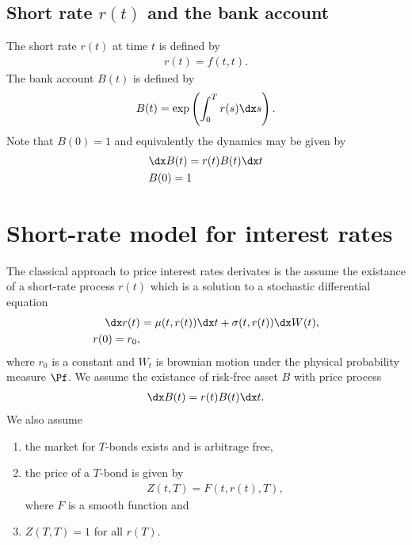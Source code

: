 \subsection{Short rate $r(t)$ and the bank account}  

The short rate $r(t)$ at time $t$ is defined by
  \begin{align}
    r(t) = f(t,t).
  \end{align}
The bank account $B(t)$ is defined by
  \begin{align}
    B(t) = \exp \left( \int_0^T r(s) \dx s \right) .
  \end{align}
Note that $B(0) = 1$ and equivalently the dynamics may be given by
  \begin{align}
    &\dx B(t) = r(t) B(t) \dx t \\
    &B(0) = 1
  \end{align}
  
\section{Short-rate model for interest rates}

The classical approach to price interest rates derivates is the assume the existance of a short-rate process $r(t)$ which is a solution to a stochastic differential equation
  \begin{align}
    \dx r(t) &= \mu(t, r(t)) \dx t + \sigma(t, r(t)) \dx W(t), \\
    r(0) = r_0,
  \end{align}
where $r_0$ is a constant and $W_t$ is brownian motion under the physical probability measure $\Pf$. We assume the existance of risk-free asset $B$ with price process
  \begin{align}
    \dx B(t) = r(t) B(t) \dx t .
  \end{align}
We also assume 
  \begin{enumerate}[labelindent=\parindent, leftmargin=*]
    \item the market for $T$-bonds exists and is arbitrage free,
    \item the price of a $T$-bond is given by
      \begin{align}
        Z(t,T) = F(t,r(t),T) ,
      \end{align}
    where $F$ is a smooth function and
    \item $Z(T,T) = 1$ for all $r(T)$.
  \end{enumerate}

